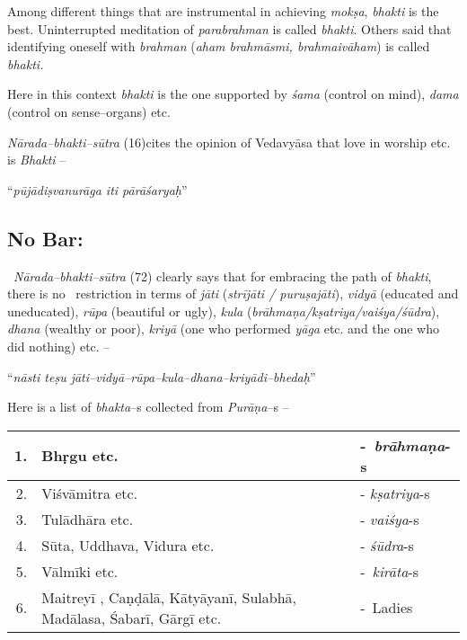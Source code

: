 \newpage

Among different things that are instrumental in achieving \textit{mokṣa}, \textit{bhakti} is the best. Uninterrupted meditation of \textit{parabrahman} is called \textit{bhakti}. Others said that identifying oneself with \textit{brahman} (\textit{aham brahmāsmi, brahmaivāham}) is called \textit{bhakti.}

Here in this context \textit{bhakti} is the one supported by \textit{śama} (control on mind), \textit{dama} (control on sense–organs) etc.

\textit{Nārada–bhakti–sūtra} (16)cites the opinion of Vedavyāsa that love in worship etc. is \textit{Bhakti} –

\begin{myquote}
“\textit{pūjādiṣvanurāga iti pārāśaryaḥ}”
\end{myquote}


\subsection*{No Bar:}

 \textit{Nārada–bhakti–sūtra} (72) clearly says that for embracing the path of \textit{bhakti}, there is no  restriction in terms of \textit{jāti} (\textit{strījāti / puruṣajāti}), \textit{vidyā} (educated and uneducated), \textit{rūpa} (beautiful or ugly), \textit{kula} (\textit{brāhmaṇa/kṣatriya/vaiśya/śūdra}), \textit{dhana} (wealthy or poor), \textit{kriyā} (one who performed \textit{yāga} etc. and the one who did nothing) etc. –

\begin{myquote}
“\textit{nāsti teṣu jāti–vidyā–rūpa–kula–dhana–kriyādi–bhedaḥ}”
\end{myquote}

Here is a list of \textit{bhakta}–s collected from \textit{Purāṇa}–s –

\begin{longtable}{|r|p{6cm}|l|}
\hline
1. & Bhṛgu etc. & - \textit{brāhmaṇa}-s \\
\hline
2. & Viśvāmitra etc. & - \textit{kṣatriya}-s \\
\hline
3. & Tulādhāra etc. & - \textit{vaiśya}-s \\
\hline
4. & Sūta, Uddhava, Vidura etc. & - \textit{śūdra}-s \\
\hline
5. & Vālmīki etc. & - \textit{kirāta}-s \\
\hline
6. & Maitreyī , Caṇḍālā, Kātyāyanī, Sulabhā, Madālasa, Śabarī, Gārgī etc. & - Ladies \\
\hline
\end{longtable}

